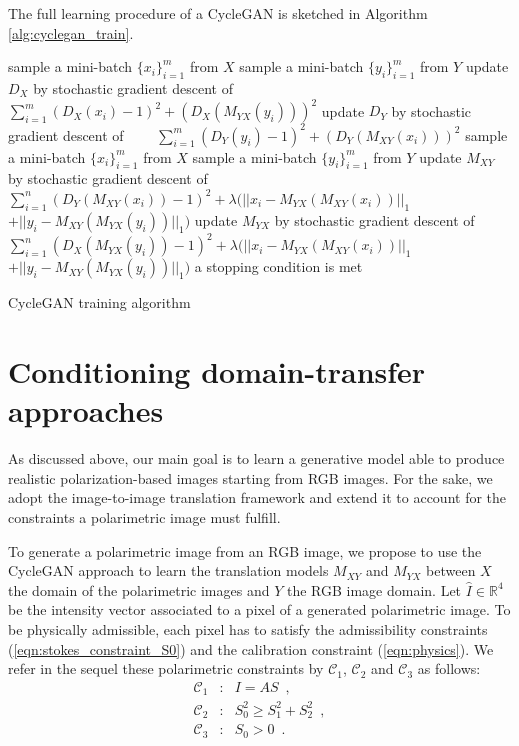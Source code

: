 The full learning procedure of a CycleGAN  is sketched in Algorithm \ref{alg:cyclegan_train}.

\begin{algorithm}[]
	\begin{algorithmic}[H]
		\REPEAT
		\STATE sample a mini-batch $\lbrace x_i \rbrace_{i=1}^m$ from $X$\;
		\STATE sample a mini-batch $\lbrace y_i \rbrace_{i=1}^m$ from $Y$\;
		\STATE update $D_X$ by stochastic gradient descent of
		\STATE \ \ \ \ $ \sum_{i=1}^{m}(D_X(x_i)-1)^2 + (D_X(M_{YX}(y_i)))^2$
		\STATE update $D_Y$ by stochastic gradient descent of
		\STATE \ \ \ \ $ \sum_{i=1}^{m}(D_Y(y_i)-1)^2 + (D_Y(M_{XY}(x_i)))^2$
		\STATE sample a mini-batch $\lbrace x_i \rbrace_{i=1}^m$ from $X$\;
		\STATE sample a mini-batch $\lbrace y_i \rbrace_{i=1}^m$ from $Y$\;
		\STATE update $M_{XY}$ by stochastic gradient descent of
		\STATE \ \ \ \ $ \sum_{i=1}^n (D_Y(M_{XY}(x_i))-1)^2 + \lambda (||x_i - M_{YX}(M_{XY}(x_i))||_1$ \STATE \ \ \ \ \ \ \ \ $+||y_i -M_{XY}(M_{YX}(y_i))||_1)$\;
		\STATE update $M_{YX}$ by stochastic gradient descent of
		\STATE \ \ \ \ $ \sum_{i=1}^n (D_X(M_{YX}(y_i))-1)^2+ \lambda (||x_i - M_{YX}(M_{XY}(x_i))||_1 $
		\STATE \ \ \ \ \ \ \ \ $+ ||y_i - M_{XY}(M_{YX}(y_i))||_1)$\;
		\UNTIL a stopping condition is met
	\end{algorithmic}
	\caption{CycleGAN training algorithm}
	\label{alg:cyclegan_train}
\end{algorithm}

\section{Conditioning domain-transfer approaches}
\label{polarGAN}

As discussed above, our main goal is to learn a generative model able to produce realistic polarization-based images starting from RGB images. For the sake, we adopt the image-to-image translation framework and extend it to account for the constraints a polarimetric image must fulfill. 

To generate a polarimetric image  from an RGB image, we propose to use the CycleGAN approach to learn the translation models $M_{XY}$ and $M_{YX}$ between $X$ the domain of the polarimetric images and $Y$ the RGB image domain. Let $\hat{I} \in \mathbb{R}^4$ be the intensity vector associated to a pixel of a generated polarimetric image. To be physically admissible, each pixel  has to satisfy the admissibility constraints (\ref{eqn:stokes_constraint_S0}) and the calibration constraint (\ref{eqn:physics}). 
%
We refer in the sequel these polarimetric constraints by $\mathcal{C}_1$, $\mathcal{C}_2$ and $\mathcal{C}_3$ as follows:
\begin{eqnarray}
\mathcal{C}_1 &:& I = AS\enspace, \nonumber\\
\mathcal{C}_2 &:& S_0^2 \geqslant S_1^2 + S_2^2 \enspace, \nonumber\\
\mathcal{C}_3 &:& S_0 > 0 \enspace. \nonumber
\end{eqnarray}

